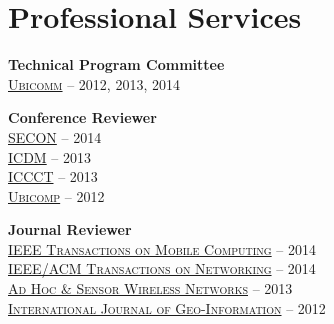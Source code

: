 \section{\sc Professional Services}
{\bf Technical Program Committee}\\
{\href{http://www.iaria.org/conferences.html}{\textsc{Ubicomm}}} -- 2012, 2013, 2014

{\bf Conference Reviewer}\\
{\href{http://secon2014.ieee-secon.org}{\textsc{SECON}}} -- 2014\\
{\href{http://icdm2013.rutgers.edu}{\textsc{ICDM}}} -- 2013\\
{\href{http://www.mnnit.ac.in/iccct2013}{\textsc{ICCCT}}} -- 2013\\
{\href{http://www.ubicomp.org/ubicomp2012}{\textsc{Ubicomp}}} -- 2012

{\bf Journal Reviewer}\\
{\href{http://www.computer.org/portal/web/tmc}{\textsc{IEEE Transactions on Mobile Computing}}} -- 2014\\
{\href{http://www.ifp.illinois.edu/ton}{\textsc{IEEE/ACM Transactions on Networking}}} -- 2014\\
{\href{http://www.oldcitypublishing.com/AHSWN/AHSWN.html}{\textsc{Ad Hoc \& Sensor Wireless Networks}}} -- 2013\\
{\href{http://www.mdpi.com/journal/ijgi}{\textsc{International Journal of Geo-Information}}} -- 2012
